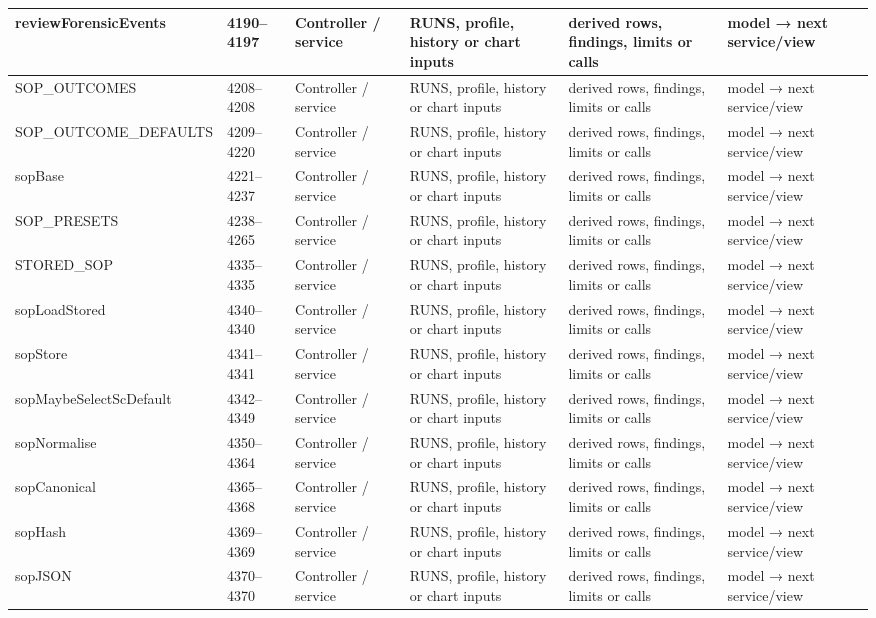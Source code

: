 \begin{landscape}
\begin{longtable}{@{}p{3.2cm}p{1.45cm}p{2.7cm}p{4.0cm}p{4.0cm}p{3.0cm}@{}}
reviewForensicEvents & 4190--4197 & Controller / service & RUNS, profile, history or chart inputs & derived rows, findings, limits or calls & model → next service/view \\\hline
SOP\_OUTCOMES & 4208--4208 & Controller / service & RUNS, profile, history or chart inputs & derived rows, findings, limits or calls & model → next service/view \\\hline
SOP\_OUTCOME\_DEFAULTS & 4209--4220 & Controller / service & RUNS, profile, history or chart inputs & derived rows, findings, limits or calls & model → next service/view \\\hline
sopBase & 4221--4237 & Controller / service & RUNS, profile, history or chart inputs & derived rows, findings, limits or calls & model → next service/view \\\hline
SOP\_PRESETS & 4238--4265 & Controller / service & RUNS, profile, history or chart inputs & derived rows, findings, limits or calls & model → next service/view \\\hline
STORED\_SOP & 4335--4335 & Controller / service & RUNS, profile, history or chart inputs & derived rows, findings, limits or calls & model → next service/view \\\hline
sopLoadStored & 4340--4340 & Controller / service & RUNS, profile, history or chart inputs & derived rows, findings, limits or calls & model → next service/view \\\hline
sopStore & 4341--4341 & Controller / service & RUNS, profile, history or chart inputs & derived rows, findings, limits or calls & model → next service/view \\\hline
sopMaybeSelectScDefault & 4342--4349 & Controller / service & RUNS, profile, history or chart inputs & derived rows, findings, limits or calls & model → next service/view \\\hline
sopNormalise & 4350--4364 & Controller / service & RUNS, profile, history or chart inputs & derived rows, findings, limits or calls & model → next service/view \\\hline
sopCanonical & 4365--4368 & Controller / service & RUNS, profile, history or chart inputs & derived rows, findings, limits or calls & model → next service/view \\\hline
sopHash & 4369--4369 & Controller / service & RUNS, profile, history or chart inputs & derived rows, findings, limits or calls & model → next service/view \\\hline
sopJSON & 4370--4370 & Controller / service & RUNS, profile, history or chart inputs & derived rows, findings, limits or calls & model → next service/view \\\hline

\end{longtable}
\end{landscape}
